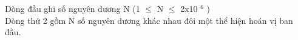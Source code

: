 Dòng đầu ghi số nguyên dương N (1  $\le$  N  $\le$  2x10 $^ 6 $ )
\\Dòng thứ 2 gồm N số nguyên dương khác nhau đôi một thể hiện hoán vị ban đầu.

\